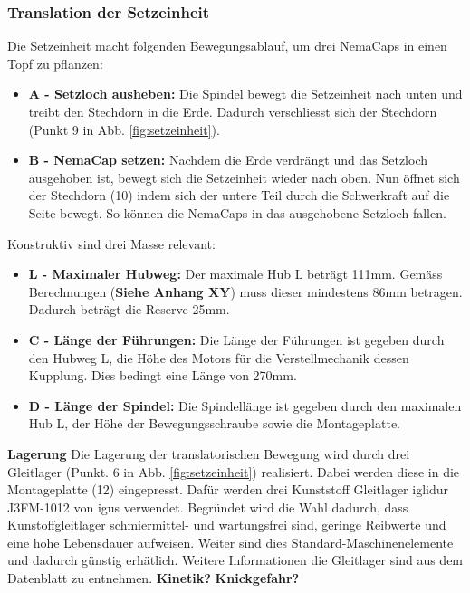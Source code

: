  
\subsubsection{Translation der Setzeinheit}
Die Setzeinheit macht folgenden Bewegungsablauf, um drei NemaCaps in einen Topf zu pflanzen:
\begin{itemize}
	\item \textbf{A - Setzloch ausheben:} Die Spindel bewegt die Setzeinheit nach unten und treibt den Stechdorn in die Erde. Dadurch verschliesst sich der Stechdorn (Punkt 9 in Abb. \ref{fig:setzeinheit}). 

	\item \textbf{B - NemaCap setzen:} Nachdem die Erde verdrängt und das Setzloch ausgehoben ist, bewegt sich die Setzeinheit wieder nach oben. Nun öffnet sich der Stechdorn (10) indem sich der untere Teil durch die Schwerkraft auf die Seite bewegt. So können die NemaCaps in das ausgehobene Setzloch fallen.
\end{itemize}

Konstruktiv sind drei Masse relevant:
\begin{itemize}
	\item \textbf{L - Maximaler Hubweg:} Der maximale Hub L beträgt 111mm. Gemäss Berechnungen (\textbf{Siehe Anhang XY}) muss dieser mindestens 86mm betragen. Dadurch beträgt die Reserve 25mm. 
	
	\item \textbf{C - Länge der Führungen:} Die Länge der Führungen ist gegeben durch den Hubweg L, die Höhe des Motors für die Verstellmechanik dessen Kupplung. Dies bedingt eine Länge von 270mm.
	
	\item \textbf{D - Länge der Spindel:} Die Spindellänge ist gegeben durch den maximalen Hub L, der Höhe der Bewegungsschraube sowie die Montageplatte.
\end{itemize}
\textbf{Lagerung}
\newline
Die Lagerung der translatorischen Bewegung wird durch drei Gleitlager (Punkt. 6 in Abb. \ref{fig:setzeinheit}) realisiert. Dabei werden diese in die Montageplatte (12) eingepresst. Dafür werden drei Kunststoff Gleitlager iglidur J3FM-1012 von igus verwendet. Begründet wird die Wahl dadurch, dass Kunstoffgleitlager schmiermittel- und wartungsfrei sind, geringe Reibwerte und eine hohe Lebensdauer aufweisen. Weiter sind dies Standard-Maschinenelemente und dadurch günstig erhätlich. Weitere Informationen die Gleitlager sind aus dem Datenblatt zu entnehmen.
\newline
\textbf{Kinetik?}
\newline
\textbf{Knickgefahr?}
\newline

